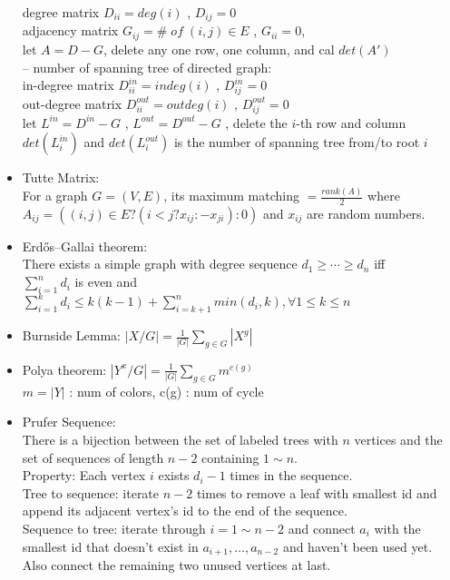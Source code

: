 \begin{itemize}[leftmargin=*]
  degree matrix $D_{ii} = deg(i)$ , $D_{ij} = 0$\\
  adjacency matrix $G_{ij} = \#\;of\;(i,j) \in E$ , $G_{ii} = 0$,\\
  let $A = D - G$, delete any one row, one column, and cal $det(A')$\\
  -- number of spanning tree of directed graph:\\
  in-degree matrix $D_{ii}^{in} = indeg(i)$ , $D_{ij}^{in} = 0$\\
  out-degree matrix $D_{ii}^{out} = outdeg(i)$ , $D_{ij}^{out} = 0$\\
  let $L^{in} = D^{in} - G$ , $L^{out} = D^{out} - G$ , delete the $i$-th row and column\\
  $det(L_i^{in})$ and $det(L_i^{out})$ is the number of spanning tree from/to root $i$\\
\item Tutte Matrix:\\
  For a graph $G=(V,E)$, its maximum matching $=\frac{rank(A)}{2}$ where\\
  $A_{ij}=((i,j)\in E ? (i < j ? x_{ij} : -x_{ji}) : 0)$ and $x_{ij}$ are random numbers.
\item Erdős–Gallai theorem:\\
  There exists a simple graph with degree sequence $d_1\ge\cdots\ge d_n$ iff\\
  $\sum\limits_{i=1}^{n} d_i$ is even and $\sum\limits_{i=1}^{k} d_i\le k(k-1)+\sum\limits_{i=k+1}^{n} min(d_i,k), \forall 1\le k\le n$
\item Burnside Lemma:
  $|X/G|=\frac{1}{|G|}\sum\limits_{g \in G} {|X^g|}$
\item Polya theorem:
  $|Y^x/G|=\frac{1}{|G|}\sum\limits_{g \in G} {m^{c(g)}}$\\
  $m = |Y|$ : num of colors, c(g) : num of cycle
\item Prufer Sequence:\\
  There is a bijection between the set of labeled trees with $n$ vertices and the set of sequences of length $n-2$ containing $1\sim n$.\\
  Property: Each vertex $i$ exists $d_i-1$ times in the sequence.\\
  Tree to sequence: iterate $n-2$ times to remove a leaf with smallest id and append its adjacent vertex's id to the end of the sequence.\\
  Sequence to tree: iterate through $i=1\sim n-2$ and connect $a_i$ with the smallest id that doesn't exist in $a_{i+1},\dots,a_{n-2}$ and haven't been used yet. Also connect the remaining two unused vertices at last.

\end{itemize}
